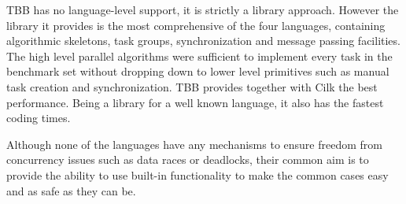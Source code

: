 TBB has no language-level support, it is strictly a library approach. However the library it provides is the most comprehensive of the four languages, containing algorithmic skeletons, task groups, synchronization and message passing facilities. The high level parallel algorithms were sufficient to implement every task in the benchmark set without dropping down to lower level primitives such as manual task creation and synchronization. TBB provides together with Cilk the best performance. Being a library for a well known language, it also has the fastest coding times.

Although none of the languages have any mechanisms to ensure freedom from concurrency issues such as data races or deadlocks, their common aim is to provide the ability to use built-in functionality to make the common cases easy and as safe as they can be.

